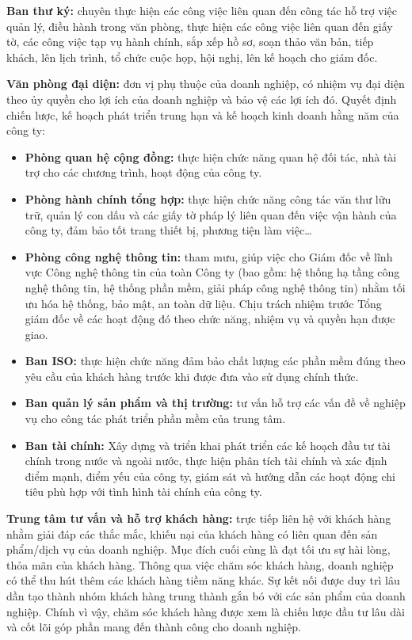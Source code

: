 \documentclass[12pt,a4paper]{report}
\begin{document}
		\hspace{0.3cm} {\textbf{Ban thư ký: } chuyên thực hiện các công việc liên quan đến công tác hỗ trợ việc quản lý, điều hành trong văn phòng, thực hiện các công việc liên quan đến giấy tờ, các công việc tạp vụ hành chính, sắp xếp hồ sơ, soạn thảo văn bản, tiếp khách, lên lịch trình, tổ chức cuộc họp, hội nghị, lên kế hoạch cho giám đốc. }
		
		\hspace{0.3cm} {\textbf{Văn phòng đại diện:} đơn vị phụ thuộc của doanh nghiệp, có nhiệm vụ đại diện theo ủy quyền cho lợi ích của doanh nghiệp và bảo vệ các lợi ích đó. Quyết định chiến lược, kế hoạch phát triển trung hạn và kế hoạch kinh doanh hằng năm của công ty:}
		
			\begin{itemize}
				\item {\textbf{Phòng quan hệ cộng đồng: } thực hiện chức năng quan hệ đối tác, nhà tài trợ cho các chương trình, hoạt động của công ty.}
				\item {\textbf{Phòng hành chính tổng hợp: } thực hiện chức năng công tác văn thư lữu trữ, quản lý con dấu và các giấy tờ pháp lý liên quan đến việc vận hành của công ty, đảm bảo tốt trang thiết bị, phương tiện làm việc…}
				\item {\textbf{Phòng công nghệ thông tin: } tham mưu, giúp việc cho Giám đốc về lĩnh vực Công nghệ thông tin của toàn Công ty (bao gồm: hệ thống hạ tầng công nghệ thông tin, hệ thống phần mềm, giải pháp công nghệ thông tin) nhằm tối ưu hóa hệ thống, bảo mật, an toàn dữ liệu. Chịu trách nhiệm trước Tổng giám đốc về các hoạt động đó theo chức năng, nhiệm vụ và quyền hạn được giao.}
				\item {\textbf{Ban ISO: } thực hiện chức năng đảm bảo chất lượng các phần mềm đúng theo yêu cầu của khách hàng trước khi được đưa vào sử dụng chính thức.}
				\item {\textbf{Ban quản lý sản phẩm và thị trường: } tư vấn hỗ trợ các vấn đề về nghiệp vụ cho công tác phát triển phần mềm của trung tâm.}
				\item {\textbf{Ban tài chính: } Xây dựng và triển khai phát triển các kế hoạch đầu tư tài chính trong nước và ngoài nước, thực hiện phân tích tài chính và xác định điểm mạnh, điểm yếu của công ty, giám sát và hướng dẫn các hoạt động chi tiêu phù hợp với tình hình tài chính của công ty.}
			\end{itemize}
		
		\hspace{0.3cm} {\textbf{Trung tâm tư vấn và hỗ trợ khách hàng:} trực tiếp liên hệ với khách hàng nhằm giải đáp các thắc mắc, khiếu nại của khách hàng có liên quan đến sản phẩm/dịch vụ của doanh nghiệp. Mục đích cuối cùng là đạt tối ưu sự hài lòng, thỏa mãn của khách hàng. Thông qua việc chăm sóc khách hàng, doanh nghiệp có thể thu hút thêm các khách hàng tiềm năng khác. Sự kết nối được duy trì lâu dần tạo thành nhóm khách hàng trung thành gắn bó với các sản phẩm của doanh nghiệp. Chính vì vậy, chăm sóc khách hàng được xem là chiến lược đầu tư lâu dài và cốt lõi góp phần mang đến thành công cho doanh nghiệp.}
		
\end{document}
